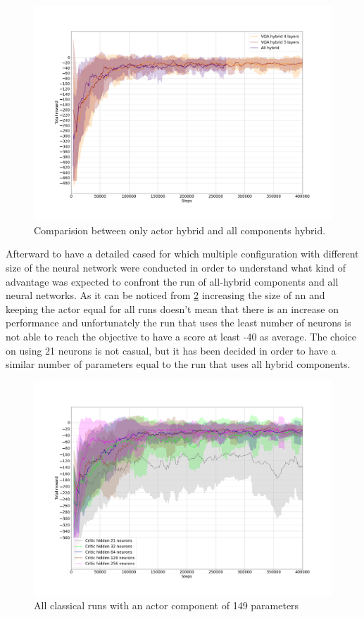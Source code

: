 \begin{figure}[H]
	\centering
	\includegraphics[width=1.0\linewidth]{"img/fully_vs_partial_quantum"}
	\caption{Comparision between only actor hybrid and all components hybrid.}
	\label{fig:fully_vs_partial_quantum}
\end{figure}
Afterward to have a detailed cased for which multiple configuration with different size of the neural network were conducted in order to understand what kind of advantage was expected to confront the run of all-hybrid components and all neural networks. As it can be noticed from \ref{fig:all-classical-results} increasing the size of \acrlong{nn} and keeping the actor equal for all runs doesn't mean that there is an increase on performance and unfortunately the run that uses the least number of neurons is not able to reach the objective to have a score at least -40 as average. The choice on using 21 neurons is not casual, but it has been decided in order to have a similar number of parameters equal to the run that uses all hybrid components.
\begin{figure}[H]
	\centering
	\includegraphics[width=0.9\linewidth]{"img/All classical results"}
	\caption{All classical runs with an actor component of 149 parameters}
	\label{fig:all-classical-results}
\end{figure}
